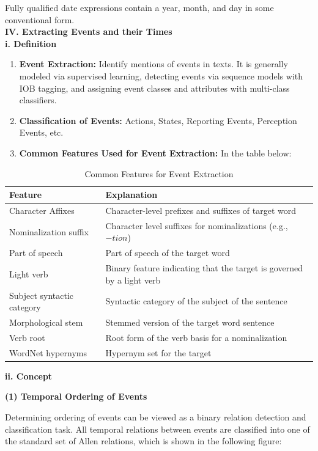 \documentclass[a4paper,12pt]{report}
\begin{document}
\noindent
Fully qualified date expressions contain a year, month, and day in some conventional form.\\

\pagebreak
\noindent
\textbf{IV. Extracting Events and their Times}\\

\noindent
\textbf{i. Definition}
\begin{enumerate}
\item \textbf{Event Extraction: }Identify mentions of events in texts. It is generally modeled via supervised learning, detecting events
via sequence models with IOB tagging, and assigning event classes and attributes with multi-class classifiers.
\item \textbf{Classification of Events: }Actions, States, Reporting Events, Perception Events, etc. 
\item \textbf{Common Features Used for Event Extraction: } In the table below: 
\end{enumerate}

\begin{table}[h]
\centering
\begin{tabular}{l l}
\hline 
 \textbf{Feature} & \textbf{Explanation}  \\
 \hline 
 Character Affixes & Character-level prefixes and suffixes of target word \\  
Nominalization suffix & Character level suffixes for nominalizations (e.g., $-tion$)	 \\
 Part of speech & Part of speech of the target word\\
 Light verb & Binary feature indicating that the target is governed by a light verb\\
 Subject syntactic category & Syntactic category of the subject of the sentence\\
 Morphological stem & Stemmed version of the target word sentence\\
 Verb root & Root form of the verb basis for a nominalization\\
 WordNet hypernyms & Hypernym set for the target
\end{tabular}
\caption{\label{tab:table-name}Common Features for Event Extraction}
\end{table}

\pagebreak 	
\noindent
\textbf{ii. Concept}

\textbf{(1) Temporal Ordering of Events}

Determining ordering of events can be viewed as a binary relation detection and classification task. All temporal relations between events are classified into one of the standard set of Allen relations, which is shown in the following figure: 
\end{document}
